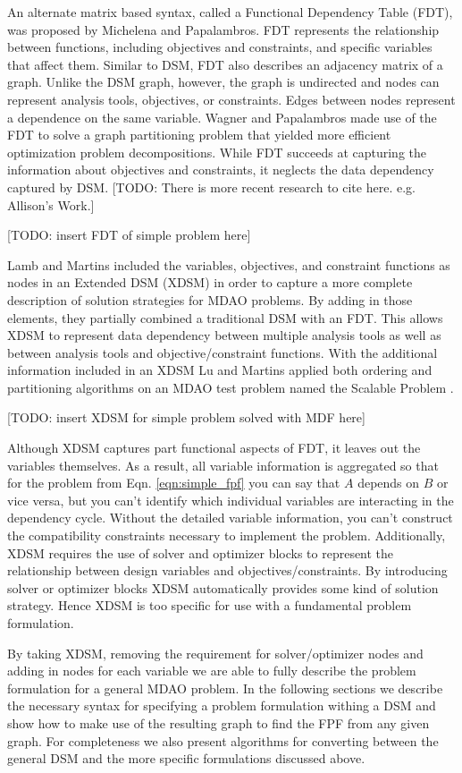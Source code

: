     An alternate matrix based syntax, called a Functional Dependency Table (FDT), was proposed by Michelena and Papalambros. 
    FDT represents the relationship between functions, including objectives and constraints, and specific variables that affect 
    them\cite{Michelena1997}. Similar to DSM, FDT also describes an adjacency matrix of a graph. Unlike the DSM graph, 
    however, the graph is undirected and nodes can represent analysis tools, objectives, 
    or constraints. Edges between nodes represent a dependence on the same 
    variable. Wagner and Papalambros made use of the FDT to solve a graph partitioning problem that yielded 
    more efficient optimization problem decompositions\cite{Wagner1993}. While FDT succeeds at capturing the 
    information about objectives and constraints, it neglects the data dependency captured by DSM. 
    [TODO: There is more recent research to cite here. e.g. Allison's Work.]

    [TODO: insert FDT of simple problem here]

    Lamb and Martins included the variables, objectives, and constraint functions as nodes in an Extended 
    DSM (XDSM) in order to capture a more complete description of solution strategies for MDAO problems\cite{Lambe2012}. By adding in those 
    elements, they partially combined a traditional DSM with an FDT. 
    This allows XDSM to represent data dependency between multiple analysis tools as well as between analysis tools and
    objective/constraint functions. With the additional information included in an XDSM Lu and Martins applied both ordering and partitioning 
    algorithms on an MDAO test problem named the Scalable Problem \cite{Lu2012}. 

    [TODO: insert XDSM for simple problem solved with MDF here]

    Although XDSM captures part functional aspects of FDT, it  leaves out the variables themselves. As a result, all variable information is aggregated 
    so that for the problem from Eqn. \ref{eqn:simple_fpf} you can say that $A$ depends on $B$ or vice versa, but you can't identify which 
    individual variables are interacting in the dependency cycle. Without the detailed variable information, you can't construct the compatibility 
    constraints necessary to implement the problem. Additionally, XDSM requires the use of solver and optimizer blocks to represent 
    the relationship between design variables and objectives/constraints. By introducing solver or optimizer blocks XDSM automatically provides
    some kind of solution strategy. Hence XDSM is too specific for use with a fundamental problem formulation. 

    By taking XDSM, removing the requirement for solver/optimizer nodes and adding in nodes for each variable we are able to fully describe 
    the problem formulation for a general MDAO problem. In the following sections we describe the necessary syntax for specifying a 
    problem formulation withing a DSM and show how to make use of the resulting graph to find the FPF from any given graph. For completeness we 
    also present algorithms for converting between the general DSM and the more specific formulations discussed above. 


